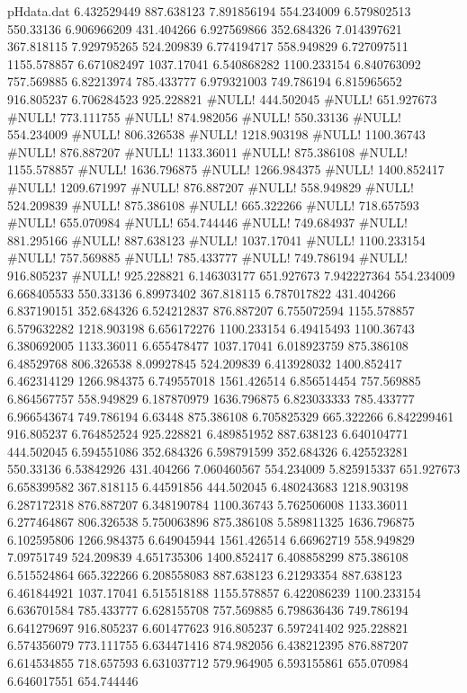 \begin{filecontents}{pHdata.dat}
6.432529449	887.638123
7.891856194	554.234009
6.579802513	550.33136
6.906966209	431.404266
6.927569866	352.684326
7.014397621	367.818115
7.929795265	524.209839
6.774194717	558.949829
6.727097511	1155.578857
6.671082497	1037.17041
6.540868282	1100.233154
6.840763092	757.569885
6.82213974	785.433777
6.979321003	749.786194
6.815965652	916.805237
6.706284523	925.228821
#NULL!	444.502045
#NULL!	651.927673
#NULL!	773.111755
#NULL!	874.982056
#NULL!	550.33136
#NULL!	554.234009
#NULL!	806.326538
#NULL!	1218.903198
#NULL!	1100.36743
#NULL!	876.887207
#NULL!	1133.36011
#NULL!	875.386108
#NULL!	1155.578857
#NULL!	1636.796875
#NULL!	1266.984375
#NULL!	1400.852417
#NULL!	1209.671997
#NULL!	876.887207
#NULL!	558.949829
#NULL!	524.209839
#NULL!	875.386108
#NULL!	665.322266
#NULL!	718.657593
#NULL!	655.070984
#NULL!	654.744446
#NULL!	749.684937
#NULL!	881.295166
#NULL!	887.638123
#NULL!	1037.17041
#NULL!	1100.233154
#NULL!	757.569885
#NULL!	785.433777
#NULL!	749.786194
#NULL!	916.805237
#NULL!	925.228821
6.146303177	651.927673
7.942227364	554.234009
6.668405533	550.33136
6.89973402	367.818115
6.787017822	431.404266
6.837190151	352.684326
6.524212837	876.887207
6.755072594	1155.578857
6.579632282	1218.903198
6.656172276	1100.233154
6.49415493	1100.36743
6.380692005	1133.36011
6.655478477	1037.17041
6.018923759	875.386108
6.48529768	806.326538
8.09927845	524.209839
6.413928032	1400.852417
6.462314129	1266.984375
6.749557018	1561.426514
6.856514454	757.569885
6.864567757	558.949829
6.187870979	1636.796875
6.823033333	785.433777
6.966543674	749.786194
6.63448	875.386108
6.705825329	665.322266
6.842299461	916.805237
6.764852524	925.228821
6.489851952	887.638123
6.640104771	444.502045
6.594551086	352.684326
6.598791599	352.684326
6.425523281	550.33136
6.53842926	431.404266
7.060460567	554.234009
5.825915337	651.927673
6.658399582	367.818115
6.44591856	444.502045
6.480243683	1218.903198
6.287172318	876.887207
6.348190784	1100.36743
5.762506008	1133.36011
6.277464867	806.326538
5.750063896	875.386108
5.589811325	1636.796875
6.102595806	1266.984375
6.649045944	1561.426514
6.66962719	558.949829
7.09751749	524.209839
4.651735306	1400.852417
6.408858299	875.386108
6.515524864	665.322266
6.208558083	887.638123
6.21293354	887.638123
6.461844921	1037.17041
6.515518188	1155.578857
6.422086239	1100.233154
6.636701584	785.433777
6.628155708	757.569885
6.798636436	749.786194
6.641279697	916.805237
6.601477623	916.805237
6.597241402	925.228821
6.574356079	773.111755
6.634471416	874.982056
6.438212395	876.887207
6.614534855	718.657593
6.631037712	579.964905
6.593155861	655.070984
6.646017551	654.744446

\end{filecontents}
